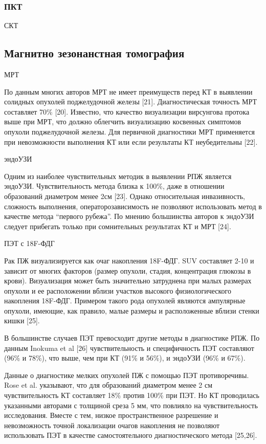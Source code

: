 \subsubsection{ПКТ}

СКТ

\subsection{Магнитно зезонанстная томография}
МРТ

По данным многих авторов МРТ не имеет преимуществ перед КТ в выявлении солидных опухолей поджелудочной железы [21]. Диагностическая точность МРТ составляет 70\% [20].  Известно, что качество визуализации вирсунгова протока выше при МРТ, что должно облегчить визуализацию косвенных симптомов опухоли поджелудочной железы.
Для первичной диагностики МРТ применяется при невозможности выполнения КТ или если результаты КТ неубедительны [22].

эндоУЗИ

Одним из наиболее чувствительных методик в выявлении РПЖ является эндоУЗИ. Чувствительность метода близка к 100\%, даже в отношении образований диаметром менее 2см [23]. 
Однако относительная инвазивность, сложность выполнения, операторозависимость не позволяют использовать метод в качестве метода “первого рубежа”. По мнению большинства авторов к эндоУЗИ следует прибегать только при сомнительных результатах КТ и МРТ [24].

ПЭТ с 18F-ФДГ

Рак ПЖ визуализируется как очаг накопления 18F-ФДГ. SUV составляет 2-10 и зависит от многих факторов (размер опухоли, стадия, концентрация глюкозы в крови). Визуализация может быть значительно затруднена при малых размерах опухоли и ее расположении вблизи участков высокого физиологического накопления 18F-ФДГ. Примером такого рода опухолей являются ампулярные опухоли, имеющие, как правило, малые размеры и расположенные вблизи стенки кишки [25].

В большинстве случаев ПЭТ превосходит другие методы в диагностике РПЖ. По данным Inokuma et al [26] чувствительность и специфичность ПЭТ составляют (96\% и 78\%), что выше, чем при КТ (91\% и 56\%), и эндоУЗИ (96\% и 67\%).

Данные о диагностике мелких опухолей ПЖ с помощью ПЭТ противоречивы. Rose et al. указывают, что для образований диаметром менее 2 см чувствительность КТ составляет 18\% против 100\% при ПЭТ. Но КТ проводилась указанными авторами с толщиной среза 5 мм, что повлияло на чувствительность исследования. Вместе с тем, низкое пространственное разрешение и невозможность точной локализации очагов накопления не позволяют использовать ПЭТ в качестве самостоятельного диагностического метода [25,26].

